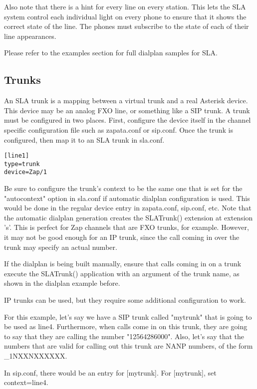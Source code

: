 \documentclass[12pt,a4]{article}
\begin{document}
Also note that there is a hint for every line on every station.  This lets the SLA
system control each individual light on every phone to ensure that it shows the
correct state of the line.  The phones must subscribe to the state of each of their
line appearances.

Please refer to the examples section for full dialplan samples for SLA.

\subsection{Trunks}
\label{trunks}

An SLA trunk is a mapping between a virtual trunk and a real Asterisk device.
This device may be an analog FXO line, or something like a SIP trunk.  A trunk
must be configured in two places.  First, configure the device itself in the
channel specific configuration file such as zapata.conf or sip.conf.  Once the
trunk is configured, then map it to an SLA trunk in sla.conf.  

\begin{verbatim}
[line1]
type=trunk
device=Zap/1
\end{verbatim}

Be sure to configure the trunk's context to be the same one that is set for the
"autocontext" option in sla.conf if automatic dialplan configuration is used.
This would be done in the regular device entry in zapata.conf, sip.conf, etc.
Note that the automatic dialplan generation creates the SLATrunk() extension
at extension 's'.  This is perfect for Zap channels that are FXO trunks, for
example.  However, it may not be good enough for an IP trunk, since the call
coming in over the trunk may specify an actual number.

If the dialplan is being built manually, ensure that calls coming in on a trunk
execute the SLATrunk() application with an argument of the trunk name, as shown
in the dialplan example before.

IP trunks can be used, but they require some additional configuration to work.

For this example, let's say we have a SIP trunk called "mytrunk" that is going
to be used as line4.  Furthermore, when calls come in on this trunk, they are
going to say that they are calling the number "12564286000".  Also, let's say
that the numbers that are valid for calling out this trunk are NANP numbers,
of the form \_1NXXNXXXXXX.

In sip.conf,  there would be an entry for [mytrunk].  For [mytrunk], 
set context=line4.
\end{document}
